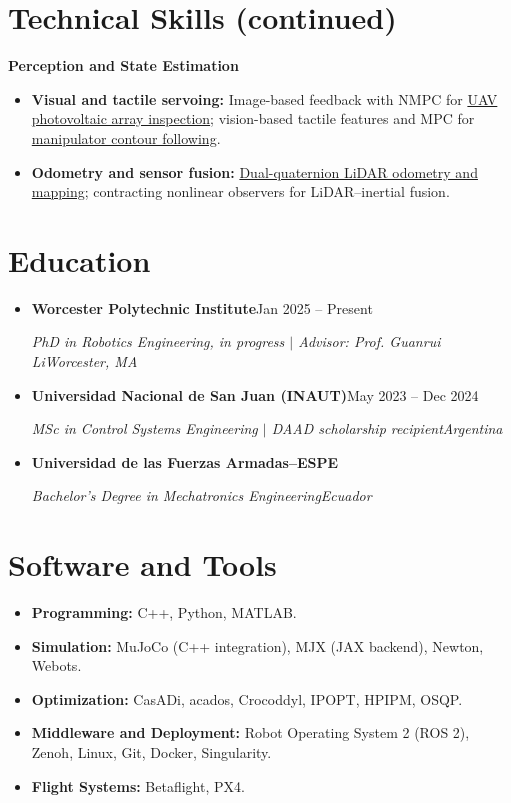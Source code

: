 \documentclass[letterpaper,11pt]{article}
\newcommand{\resumeSubheading}[4]{
  \vspace{-2pt}\item
    \textbf{#1}\enspace\textbar\enspace #2\\
    {\small\textit{#3\enspace\textbar\enspace #4}\par}\vspace{-5pt}
}
\newcommand{\resumeSubHeadingListStart}{\begin{itemize}[leftmargin=0.15in, label={}, topsep=3pt]}
\newcommand{\resumeSubHeadingListEnd}{\end{itemize}}
\begin{document}
\section{Technical Skills (continued)}
{\small\textbf{Perception and State Estimation}\par}
\begin{itemize}[leftmargin=0.22in, itemsep=2pt, parsep=0pt, topsep=4pt]
\small
\item \textbf{Visual and tactile servoing:} Image-based feedback with NMPC for \href{https://doi.org/10.1109/LRA.2024.3360876}{UAV photovoltaic array inspection}; vision-based tactile features and MPC for \href{https://doi.org/10.1109/LRA.2026.3698362}{manipulator contour following}.
\item \textbf{Odometry and sensor fusion:} \href{https://doi.org/10.1016/j.robot.2025.105009}{Dual-quaternion LiDAR odometry and mapping}; contracting nonlinear observers for LiDAR--inertial fusion.
\end{itemize}

\section{Education}
\resumeSubHeadingListStart
\resumeSubheading{Worcester Polytechnic Institute}{Jan 2025 -- Present}
{PhD in Robotics Engineering, in progress $|$ Advisor: Prof. Guanrui Li}{Worcester, MA}
\resumeSubheading{Universidad Nacional de San Juan (INAUT)}{May 2023 -- Dec 2024}
{MSc in Control Systems Engineering $|$ DAAD scholarship recipient}{Argentina}
\resumeSubheading{Universidad de las Fuerzas Armadas--ESPE}{2021}
{Bachelor's Degree in Mechatronics Engineering}{Ecuador}
\resumeSubHeadingListEnd

\section{Software and Tools}
\begin{itemize}[leftmargin=0.15in, label={}, itemsep=2pt, parsep=0pt, topsep=3pt]
\small
\item \textbf{Programming:} C++, Python, MATLAB.
\item \textbf{Simulation:} MuJoCo (C++ integration), MJX (JAX backend), Newton, Webots.
\item \textbf{Optimization:} CasADi, acados, Crocoddyl, IPOPT, HPIPM, OSQP.
\item \textbf{Middleware and Deployment:} Robot Operating System 2 (ROS 2), Zenoh, Linux, Git, Docker, Singularity.
\item \textbf{Flight Systems:} Betaflight, PX4.
\end{itemize}
\end{document}
